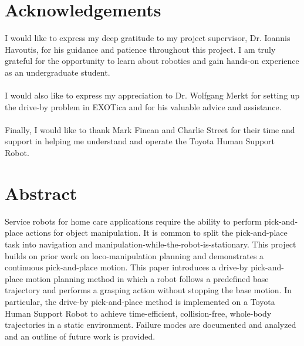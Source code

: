 \documentclass[11pt]{article}
\begin{document}
\section{Acknowledgements}
    I would like to express my deep gratitude to my project supervisor, Dr. Ioannis Havoutis, for his guidance and patience throughout this project. I am truly grateful for the opportunity to learn about robotics and gain hands-on experience as an undergraduate student.\\
    \hspace*{\fill}\\
    I would also like to express my appreciation to Dr. Wolfgang Merkt for setting up the drive-by problem in EXOTica and for his valuable advice and assistance.\\
    \hspace*{\fill}\\
    Finally, I would like to thank Mark Finean and Charlie Street for their time and support in helping me understand and operate the Toyota Human Support Robot.
\newpage


\section{Abstract}
    Service robots for home care applications require the ability to perform pick-and-place actions for object manipulation. It is common to split the pick-and-place task into navigation and manipulation-while-the-robot-is-stationary. This project builds on prior work on loco-manipulation planning and demonstrates a continuous pick-and-place motion. This paper introduces a drive-by pick-and-place motion planning method in which a robot follows a predefined base trajectory and performs a grasping action without stopping the base motion. In particular, the drive-by pick-and-place method is implemented on a Toyota Human Support Robot to achieve time-efficient, collision-free, whole-body trajectories in a static environment. Failure modes are documented and analyzed and an outline of future work is provided.
\newpage
\tableofcontents
\newpage
\end{document}
